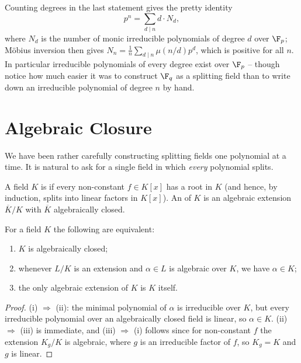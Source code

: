 Counting degrees in the last statement gives the pretty identity
$$p^n = \sum_{d \mid n} d \cdot N_d,$$
where $N_d$ is the number of monic irreducible polynomials of degree $d$ over $\F_p$; M\"obius inversion then gives $N_n = \frac{1}{n}\sum_{d\mid n}\mu(n/d)p^d$, which is positive for all $n$. In particular irreducible polynomials of every degree exist over $\F_p$ -- though notice how much easier it was to construct $\F_q$ as a splitting field than to write down an irreducible polynomial of degree $n$ by hand.

\section{Algebraic Closure}

We have been rather carefully constructing splitting fields one polynomial at a time. It is natural to ask for a single field in which \emph{every} polynomial splits.

\begin{definition}
	A field $K$ is  if every non-constant $f \in K[x]$ has a root in $K$ (and hence, by induction, splits into linear factors in $K[x]$). An  of $K$ is an algebraic extension $\overline K/K$ with $\overline K$ algebraically closed.
\end{definition}

\begin{lemma}
	For a field $K$ the following are equivalent:
	\begin{enumerate}[label=(\roman*)]
		\item $K$ is algebraically closed;
		\item whenever $L/K$ is an extension and $\alpha \in L$ is algebraic over $K$, we have $\alpha \in K$;
		\item the only algebraic extension of $K$ is $K$ itself.
	\end{enumerate}
\end{lemma}

\begin{proof}
	(i) $\Rightarrow$ (ii): the minimal polynomial of $\alpha$ is irreducible over $K$, but every irreducible polynomial over an algebraically closed field is linear, so $\alpha \in K$. (ii) $\Rightarrow$ (iii) is immediate, and (iii) $\Rightarrow$ (i) follows since for non-constant $f$ the extension $K_g/K$ is algebraic, where $g$ is an irreducible factor of $f$, so $K_g = K$ and $g$ is linear.
\end{proof}

